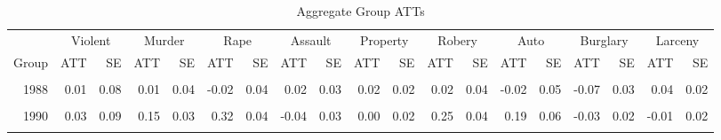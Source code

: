 \begin{table}[!h]

\caption{\label{tab:CSEst}Aggregate Group ATTs}
\centering
\begin{tabular}[t]{rrrrrrrrrrrrrrrrrrr}
\toprule
\multicolumn{1}{c}{ } & \multicolumn{2}{c}{Violent} & \multicolumn{2}{c}{Murder} & \multicolumn{2}{c}{Rape} & \multicolumn{2}{c}{Assault} & \multicolumn{2}{c}{Property} & \multicolumn{2}{c}{Robery} & \multicolumn{2}{c}{Auto} & \multicolumn{2}{c}{Burglary} & \multicolumn{2}{c}{Larceny} \\
\cmidrule(l{3pt}r{3pt}){2-3} \cmidrule(l{3pt}r{3pt}){4-5} \cmidrule(l{3pt}r{3pt}){6-7} \cmidrule(l{3pt}r{3pt}){8-9} \cmidrule(l{3pt}r{3pt}){10-11} \cmidrule(l{3pt}r{3pt}){12-13} \cmidrule(l{3pt}r{3pt}){14-15} \cmidrule(l{3pt}r{3pt}){16-17} \cmidrule(l{3pt}r{3pt}){18-19}
Group & ATT & SE & ATT & SE & ATT & SE & ATT & SE & ATT & SE & ATT & SE & ATT & SE & ATT & SE & ATT & SE\\
\midrule
\cellcolor{gray!6}{1987} & \cellcolor{gray!6}{-0.13} & \cellcolor{gray!6}{0.08} & \cellcolor{gray!6}{-0.33} & \cellcolor{gray!6}{0.04} & \cellcolor{gray!6}{-0.17} & \cellcolor{gray!6}{0.04} & \cellcolor{gray!6}{-0.05} & \cellcolor{gray!6}{0.03} & \cellcolor{gray!6}{-0.10} & \cellcolor{gray!6}{0.03} & \cellcolor{gray!6}{-0.28} & \cellcolor{gray!6}{0.04} & \cellcolor{gray!6}{0.00} & \cellcolor{gray!6}{0.05} & \cellcolor{gray!6}{-0.12} & \cellcolor{gray!6}{0.03} & \cellcolor{gray!6}{-0.09} & \cellcolor{gray!6}{0.02}\\
1988 & 0.01 & 0.08 & 0.01 & 0.04 & -0.02 & 0.04 & 0.02 & 0.03 & 0.02 & 0.02 & 0.02 & 0.04 & -0.02 & 0.05 & -0.07 & 0.03 & 0.04 & 0.02\\
\cellcolor{gray!6}{1989} & \cellcolor{gray!6}{-0.03} & \cellcolor{gray!6}{0.31} & \cellcolor{gray!6}{-0.21} & \cellcolor{gray!6}{0.11} & \cellcolor{gray!6}{-0.06} & \cellcolor{gray!6}{0.10} & \cellcolor{gray!6}{0.02} & \cellcolor{gray!6}{0.19} & \cellcolor{gray!6}{0.02} & \cellcolor{gray!6}{0.06} & \cellcolor{gray!6}{-0.14} & \cellcolor{gray!6}{0.14} & \cellcolor{gray!6}{-0.17} & \cellcolor{gray!6}{0.10} & \cellcolor{gray!6}{-0.03} & \cellcolor{gray!6}{0.09} & \cellcolor{gray!6}{0.06} & \cellcolor{gray!6}{0.06}\\
1990 & 0.03 & 0.09 & 0.15 & 0.03 & 0.32 & 0.04 & -0.04 & 0.03 & 0.00 & 0.02 & 0.25 & 0.04 & 0.19 & 0.06 & -0.03 & 0.02 & -0.01 & 0.02\\
\cellcolor{gray!6}{1991} & \cellcolor{gray!6}{0.48} & \cellcolor{gray!6}{0.09} & \cellcolor{gray!6}{-0.36} & \cellcolor{gray!6}{0.04} & \cellcolor{gray!6}{0.20} & \cellcolor{gray!6}{0.03} & \cellcolor{gray!6}{0.55} & \cellcolor{gray!6}{0.03} & \cellcolor{gray!6}{0.01} & \cellcolor{gray!6}{0.02} & \cellcolor{gray!6}{0.28} & \cellcolor{gray!6}{0.04} & \cellcolor{gray!6}{0.03} & \cellcolor{gray!6}{0.06} & \cellcolor{gray!6}{-0.11} & \cellcolor{gray!6}{0.03} & \cellcolor{gray!6}{0.01} & \cellcolor{gray!6}{0.02}\\
\bottomrule
\end{tabular}
\end{table}

